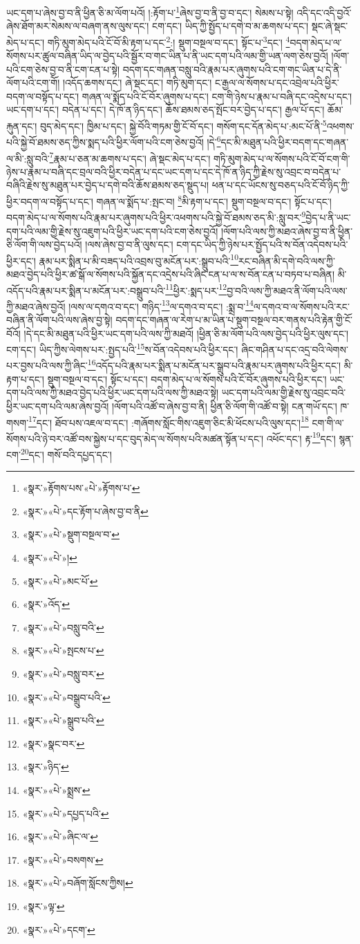 ཡང་དག་པ་ཞེས་བྱ་བ་ནི་ཕྱིན་ཅི་མ་ལོག་པའོ། །:རྟོག་པ་\footnote{«སྣར་»རྟོགས་པས་«པེ་»རྟོགས་པ་}ཞེས་བྱ་བ་ནི་བྱ་བ་དང་། སེམས་པ་སྟེ། འདི་དང་འདི་བྱའོ་ཞེས་ཐོག་མར་སེམས་ལ་བཞག་ནས་ལུས་དང་། ངག་དང་། ཡིད་ཀྱི་སྤྱོད་པ་དགེ་བ་མ་ཆགས་པ་དང་། སྡང་ཞེ་སྡང་མེད་པ་དང་། གཏི་མུག་མེད་པའི་ངོ་བོ་མི་རྟག་པ་དང་\footnote{«སྣར་»«པེ་»དང་རྟོག་པ་ཞེས་བྱ་བ་ནི}:། སྡུག་བསྔལ་བ་དང་། སྟོང་པ་\footnote{«སྣར་»«པེ་»སྡུག་བསྔལ་བ་}དང་། \footnote{«སྣར་»«པེ་»།  }བདག་མེད་པ་ལ་སོགས་པར་ཚུལ་བཞིན་ཡིད་ལ་བྱེད་པའི་སྦྱོར་བ་གང་ཡིན་པ་ནི་ཡང་དག་པའི་ལམ་གྱི་ཡན་ལག་ཅེས་བྱའོ། །ལོག་པའི་ངག་ཅེས་བྱ་བ་ནི་ངག་ངན་པ་སྟེ། བདག་དང་གཞན་བསླུ་བའི་རྣམ་པར་ཞུགས་པའི་ངག་གང་ཡིན་པ་དེ་ནི་ལོག་པའི་ངག་གོ། །འདོད་ཆགས་དང་། ཞེ་སྡང་དང་། གཏི་མུག་དང་། ང་རྒྱལ་ལ་སོགས་པ་དང་འབྲེལ་པའི་ཕྱིར་བདག་ལ་བསྟོད་པ་དང་། གཞན་ལ་སྨོད་པའི་ངོ་བོར་ཞུགས་པ་དང་། ངག་གི་ཉེས་པ་རྣམ་པ་བཞི་དང་འདྲེས་པ་དང་། ཡང་དག་པ་དང་། བདེན་པ་དང་། དེ་ཁོ་ན་ཉིད་དང་། ཆོས་ཐམས་ཅད་སྤོང་བར་བྱེད་པ་དང་། རྒྱལ་པོ་དང་། ཆོམ་རྐུན་དང་། བུད་མེད་དང་། ཁྱིམ་པ་དང་། སྐྱེ་བོའི་གཏམ་གྱི་ངོ་བོ་དང་། གསོག་དང་དོན་མེད་པ་:མང་པོ་ནི་\footnote{«སྣར་»«པེ་»མང་པོ་}འཕགས་པའི་སྐྱེ་བོ་ཐམས་ཅད་ཀྱིས་སྨད་པའི་ཕྱིར་ལོག་པའི་ངག་ཅེས་བྱའོ། །དེ་\footnote{«སྣར་»འོད་}དང་མི་མཐུན་པའི་ཕྱིར་བདག་དང་གཞན་ལ་མི་:སླུ་བའི་\footnote{«སྣར་»«པེ་»བསླུ་བའི་}རྣམ་པ་ཅན་མ་ཆགས་པ་དང་། ཞེ་སྡང་མེད་པ་དང་། གཏི་མུག་མེད་པ་ལ་སོགས་པའི་ངོ་བོ་ངག་གི་ཉེས་པ་རྣམ་པ་བཞི་དང་བྲལ་བའི་ཕྱིར་བདེན་པ་དང་ཡང་དག་པ་དང་དེ་ཁོ་ན་ཉིད་ཀྱི་རྗེས་སུ་འབྲང་བ་བདེན་པ་བཞིའི་རྗེས་སུ་མཐུན་པར་བྱེད་པ་དགེ་བའི་ཆོས་ཐམས་ཅད་སྡུད་པ། ཕན་པ་དང་ཡོངས་སུ་བཅད་པའི་ངོ་བོ་ཉིད་ཀྱི་ཕྱིར་བདག་ལ་བསྟོད་པ་དང་། གཞན་ལ་སྨོད་པ་:སྤང་བ། \footnote{«སྣར་»«པེ་»སྤངས་པ་}མི་རྟག་པ་དང་། སྡུག་བསྔལ་བ་དང་། སྟོང་པ་དང་། བདག་མེད་པ་ལ་སོགས་པའི་རྣམ་པར་ཞུགས་པའི་ཕྱིར་འཕགས་པའི་སྐྱེ་བོ་ཐམས་ཅད་མི་:སླུ་བར་\footnote{«སྣར་»«པེ་»བསླུ་བར་}བྱེད་པ་ནི་ཡང་དག་པའི་ལམ་གྱི་རྗེས་སུ་འཇུག་པའི་ཕྱིར་ཡང་དག་པའི་ངག་ཅེས་བྱའོ། །ལོག་པའི་ལས་ཀྱི་མཐའ་ཞེས་བྱ་བ་ནི་ཕྱིན་ཅི་ལོག་གི་ལས་བྱེད་པའོ། །ལས་ཞེས་བྱ་བ་ནི་ལུས་དང་། ངག་དང་ཡིད་ཀྱི་ཉེས་པར་སྤྱོད་པའི་ས་བོན་འདེབས་པའི་ཕྱིར་དང་། རྣམ་པར་སྨིན་པ་མི་བཟད་པའི་འབྲས་བུ་མངོན་པར་:སྒྲུབ་པའི་\footnote{«སྣར་»«པེ་»བསྒྲུབ་པའི་}རང་བཞིན་མི་དགེ་བའི་ལས་ཀྱི་མཐའ་བྱེད་པའི་ཕྱིར་ཚ་སྒོ་ལ་སོགས་པའི་སྐྱོན་དང་འདྲེས་པའི་ཞིང་ངན་པ་ལ་ས་བོན་ངན་པ་བཏབ་པ་བཞིན། མི་འདོད་པའི་རྣམ་པར་སྨིན་པ་མངོན་པར་:བསྒྲུབ་པའི་\footnote{«སྣར་»«པེ་»སྒྲུབ་པའི་}ཕྱིར་:སྨད་པར་\footnote{«སྣར་»སྣང་བར་}བྱ་བའི་ལས་ཀྱི་མཐའ་ནི་ལོག་པའི་ལས་ཀྱི་མཐའ་ཞེས་བྱའོ། །ལས་ལ་དགའ་བ་དང་། གཉིད་\footnote{«སྣར་»ཉིད་}ལ་དགའ་བ་དང་། :སྨྲ་བ་\footnote{«སྣར་»«པེ་»སྨྲས་}ལ་དགའ་བ་ལ་སོགས་པའི་རང་བཞིན་ནི་ལོག་པའི་ལས་ཞེས་བྱ་སྟེ། བདག་དང་གཞན་ལ་རེག་པ་མ་ཡིན་པ་སྡུག་བསྔལ་བར་གནས་པའི་རྟེན་གྱི་ངོ་བོའོ། །དེ་དང་མི་མཐུན་པའི་ཕྱིར་ཡང་དག་པའི་ལས་ཀྱི་མཐའོ། །ཕྱིན་ཅི་མ་ལོག་པའི་ལས་བྱེད་པའི་ཕྱིར་ལུས་དང་། ངག་དང་། ཡིད་ཀྱིས་ལེགས་པར་:སྤྱད་པའི་\footnote{«སྣར་»«པེ་»དཔྱད་པའི་}ས་བོན་འདེབས་པའི་ཕྱིར་དང་། ཞིང་གཤིན་པ་དང་འདྲ་བའི་ལེགས་པར་བྱས་པའི་ལས་ཀྱི་ཞིང་\footnote{«སྣར་»«པེ་»ཞིང་ལ་}འདོད་པའི་རྣམ་པར་སྨིན་པ་མངོན་པར་སྒྲུབ་པའི་རྣམ་པར་ཞུགས་པའི་ཕྱིར་དང་། མི་རྟག་པ་དང་། སྡུག་བསྔལ་བ་དང་། སྟོང་པ་དང་། བདག་མེད་པ་ལ་སོགས་པའི་ངོ་བོར་ཞུགས་པའི་ཕྱིར་དང་། ཡང་དག་པའི་ལས་ཀྱི་མཐའ་བྱེད་པའི་ཕྱིར་ཡང་དག་པའི་ལས་ཀྱི་མཐའ་སྟེ། ཡང་དག་པའི་ལམ་གྱི་རྗེས་སུ་འབྲང་བའི་ཕྱིར་ཡང་དག་པའི་ལམ་ཞེས་བྱའོ། །ལོག་པའི་འཚོ་བ་ཞེས་བྱ་བ་ནི། ཕྱིན་ཅི་ལོག་གི་འཚོ་བ་སྟེ། ངན་གཡོ་དང་། ཁ་གསག་\footnote{«སྣར་»«པེ་»བསགས་}དང་། ཐོབ་པས་འཇལ་བ་དང་། :གཞོགས་སློང་གིས་འཇུག་ཅིང་མི་ཕོངས་པའི་ལུས་དང་།\footnote{«སྣར་»«པེ་»བཞོག་སློངས་ཀྱིས།} ངག་གི་ལ་སོགས་པའི་ཉེ་བར་འཚོ་བས་སྐྱེས་པ་དང་བུད་མེད་ལ་སོགས་པའི་མཚན་སྟོན་པ་དང་། འཕོང་དང་། རྟ་\footnote{«སྣར་»ལྟ་}དང་། སྙན་ངག་\footnote{«སྣར་»«པེ་»དངག་}དང་། གསོ་བའི་དཔྱད་དང་། 